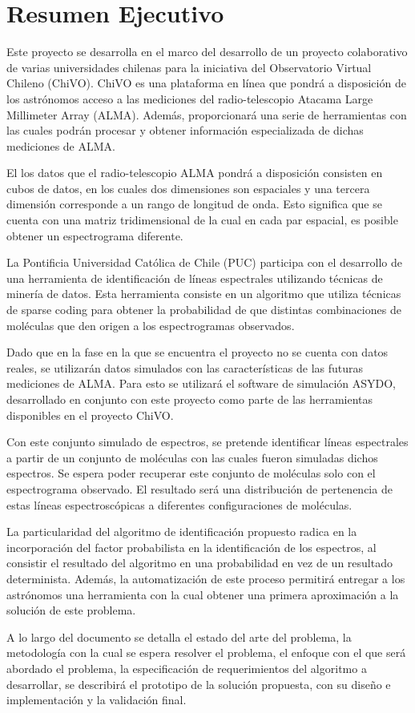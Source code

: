 \section{Resumen Ejecutivo}

Este proyecto se desarrolla en el marco del desarrollo de un proyecto colaborativo de varias universidades chilenas para la iniciativa del Observatorio Virtual Chileno (ChiVO). ChiVO es una plataforma en línea que pondrá a disposición de los astrónomos acceso a las mediciones del radio-telescopio Atacama Large Millimeter Array (ALMA). Además, proporcionará una serie de herramientas con las cuales podrán procesar y obtener información especializada de dichas mediciones de ALMA.

El los datos que el radio-telescopio ALMA pondrá a disposición consisten en cubos de datos, en los cuales dos dimensiones son espaciales y una tercera dimensión corresponde a un rango de longitud de onda. Esto significa que se cuenta con una matriz tridimensional de la cual en cada par espacial, es posible obtener un espectrograma diferente.

La Pontificia Universidad Católica de Chile (PUC) participa con el desarrollo de una herramienta de identificación de líneas espectrales utilizando técnicas de minería de datos. Esta herramienta consiste en un algoritmo que utiliza técnicas de sparse coding para obtener la probabilidad de que distintas combinaciones de moléculas que den origen a los espectrogramas observados.

Dado que en la fase en la que se encuentra el proyecto no se cuenta con datos reales, se utilizarán datos simulados con las características de las futuras mediciones de ALMA. Para esto se utilizará el software de simulación ASYDO, desarrollado en conjunto con este proyecto como parte de las herramientas disponibles en el proyecto ChiVO.

Con este conjunto simulado de espectros, se pretende identificar líneas espectrales a partir de un conjunto de moléculas con las cuales fueron simuladas dichos espectros. Se espera poder recuperar este conjunto de moléculas solo con el espectrograma observado. El resultado será una distribución de pertenencia de estas líneas espectroscópicas a diferentes configuraciones de moléculas.

La particularidad del algoritmo de identificación propuesto radica en la incorporación del factor probabilista en la identificación de los espectros, al consistir el resultado del algoritmo en una probabilidad en vez de un resultado determinista. Además, la automatización de este proceso permitirá entregar a los astrónomos una herramienta con la cual obtener una primera aproximación a la solución de este problema.

A lo largo del documento se detalla el estado del arte del problema, la metodología con la cual se espera resolver el problema, el enfoque con el que será abordado el problema, la especificación de requerimientos del algoritmo a desarrollar, se describirá el prototipo de la solución propuesta, con su diseño e implementación y la validación final.
